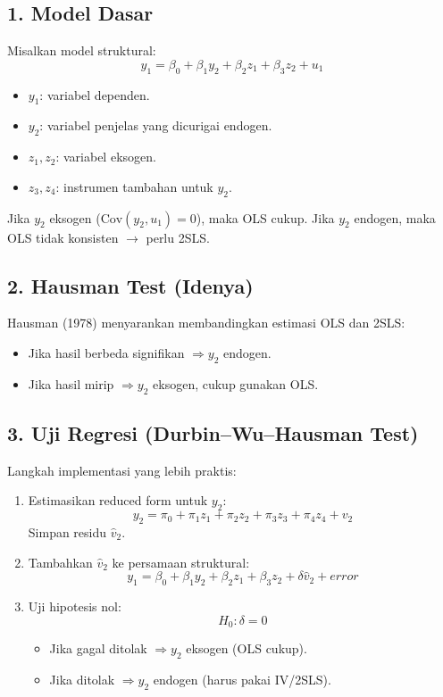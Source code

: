 \documentclass[]{article}
\begin{document}
\subsection*{1. Model Dasar}
Misalkan model struktural:
\begin{equation}
y_1 = \beta_0 + \beta_1 y_2 + \beta_2 z_1 + \beta_3 z_2 + u_1
\end{equation}

\begin{itemize}
    \item $y_1$: variabel dependen.
    \item $y_2$: variabel penjelas yang dicurigai endogen.
    \item $z_1, z_2$: variabel eksogen.
    \item $z_3, z_4$: instrumen tambahan untuk $y_2$.
\end{itemize}

Jika $y_2$ eksogen ($\text{Cov}(y_2,u_1)=0$), maka OLS cukup.  
Jika $y_2$ endogen, maka OLS tidak konsisten $\rightarrow$ perlu 2SLS.

\subsection*{2. Hausman Test (Idenya)}
Hausman (1978) menyarankan membandingkan estimasi OLS dan 2SLS:
\begin{itemize}
    \item Jika hasil berbeda signifikan $\Rightarrow y_2$ endogen.
    \item Jika hasil mirip $\Rightarrow y_2$ eksogen, cukup gunakan OLS.
\end{itemize}

\subsection*{3. Uji Regresi (Durbin--Wu--Hausman Test)}
Langkah implementasi yang lebih praktis:

\begin{enumerate}
    \item Estimasikan reduced form untuk $y_2$:
    \begin{equation}
    y_2 = \pi_0 + \pi_1 z_1 + \pi_2 z_2 + \pi_3 z_3 + \pi_4 z_4 + v_2
    \end{equation}
    Simpan residu $\hat{v}_2$.
    
    \item Tambahkan $\hat{v}_2$ ke persamaan struktural:
    \begin{equation}
    y_1 = \beta_0 + \beta_1 y_2 + \beta_2 z_1 + \beta_3 z_2 + \delta \hat{v}_2 + error
    \end{equation}
    
    \item Uji hipotesis nol:
    \[
    H_0: \delta = 0
    \]
    \begin{itemize}
        \item Jika gagal ditolak $\Rightarrow y_2$ eksogen (OLS cukup).
        \item Jika ditolak $\Rightarrow y_2$ endogen (harus pakai IV/2SLS).
    \end{itemize}
\end{enumerate}
\end{document}
